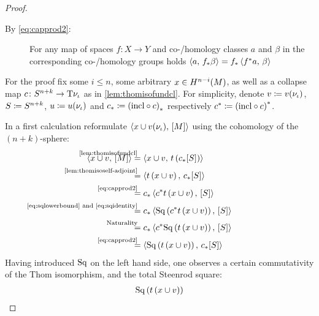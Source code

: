 \begin{Thm}
\begin{proof}
\begin{description}
    \item[By \eqref{eq:capprod2}:]
      For any map of spaces $f\colon X\to Y$ and co-/homology classes
      $a$ and $\beta$ in the corresponding co-/homology groups holds
      $\left\langle a,\, {f}_* \beta \right\rangle = {f}_* \left\langle {f}^* a,\, \beta \right\rangle$
    \end{description}
    For the proof fix some $i\leq n$, some arbitrary $x\in
    H^{n-i}(M)$, as well as a collapse map
    $c\colon S^{n+k}\to\mathrm{T}{\nu_{{\iota}}}$ as in
    \autoref{lem:thomisofundcl}.
    For simplicity, denote
    $v\coloneqq {v}(\nu_{{\iota}})$,
    $S\coloneqq S^{n+k}$,
    $u\coloneqq {u}(\nu_{{\iota}})$ and
    ${c}_*\coloneqq {(\mathrm{incl}\circ c)}_*$
    respectively
    ${c}^*\coloneqq {(\mathrm{incl}\circ c)}^*$.
    
    
    In a first calculation reformulate
    $\left\langle x\cup {v}(\nu_{{\iota}}),\, [M] \right\rangle$ using the cohomology of the
    $(n+k)$-sphere:
    \begin{align}\notag
      \capped{x\cup \Vu}{\fundcl M}
      &\equalsby{\autoref{lem:thomisofundcl}}
        \capped
        {x\cup\Vu}
        {\thomiso\left(\pf\collapse\fundcl{\Sph}\right)}
      \\\notag
      &\equalsby{\autoref{lem:thomisoself-adjoint}}
        \capped
        {\thomiso\left(x\cup\Vu\right)}
        {\pf\collapse\fundcl{\Sph}}
      \\\notag
      &\equalsby{\eqref{eq:capprod2}}
        \pf\collapse\capped
        {\pb\collapse\thomiso\left(x\cup\Vu\right)}
        {\fundcl{\Sph}}
      \\\notag
      &\equalsby{\eqref{eq:sqlowerbound} and \eqref{eq:sqidentity}}
        \pf\collapse\capped
        {\SQ\left(\pb\collapse\thomiso\left(x\cup\Vu\right)\right)}
        {\fundcl{\Sph}}
      \\\notag
      &\equalsby{Naturality}
        \pf\collapse\capped
        {\pb\collapse\SQ\left(\thomiso\left(x\cup\Vu\right)\right)}
        {\fundcl{\Sph}}
      \\\label{eq:proofaltdefwuclasses:eq1}
      &\equalsby{\eqref{eq:capprod2}}
        \capped
        {\SQ\left(\thomiso\left(x\cup\Vu\right)\right)}
        {\pf\collapse\fundcl{\Sph}}
    \end{align}
    Having introduced $\mathrm{Sq}$ on the left hand side, one observes a
    certain commutativity of the Thom isomorphism, and the total
    Steenrod square:
    \begin{align}\notag
      \SQ\left(\thomiso\left(x\cup\Vu\right)\right)

\end{align}
\end{proof}
\end{Thm}
